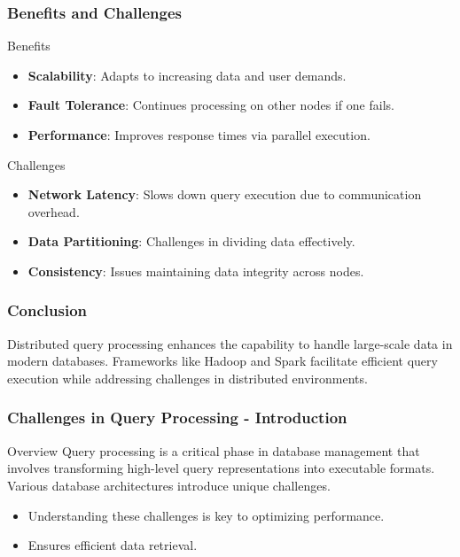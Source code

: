 \documentclass[aspectratio=169]{beamer}
\begin{document}
\begin{frame}
    \frametitle{Benefits and Challenges}
    \begin{block}{Benefits}
        \begin{itemize}
            \item \textbf{Scalability}: Adapts to increasing data and user demands.
            \item \textbf{Fault Tolerance}: Continues processing on other nodes if one fails.
            \item \textbf{Performance}: Improves response times via parallel execution.
        \end{itemize}
    \end{block}

    \begin{block}{Challenges}
        \begin{itemize}
            \item \textbf{Network Latency}: Slows down query execution due to communication overhead.
            \item \textbf{Data Partitioning}: Challenges in dividing data effectively.
            \item \textbf{Consistency}: Issues maintaining data integrity across nodes.
        \end{itemize}
    \end{block}
\end{frame}

\begin{frame}
    \frametitle{Conclusion}
    Distributed query processing enhances the capability to handle large-scale data in modern databases. Frameworks like Hadoop and Spark facilitate efficient query execution while addressing challenges in distributed environments.
\end{frame}

\begin{frame}[fragile]
    \frametitle{Challenges in Query Processing - Introduction}
    \begin{block}{Overview}
        Query processing is a critical phase in database management that involves transforming high-level query representations into executable formats. Various database architectures introduce unique challenges.
    \end{block}
    \begin{itemize}
        \item Understanding these challenges is key to optimizing performance.
        \item Ensures efficient data retrieval.
    \end{itemize}
\end{frame}
\end{document}
